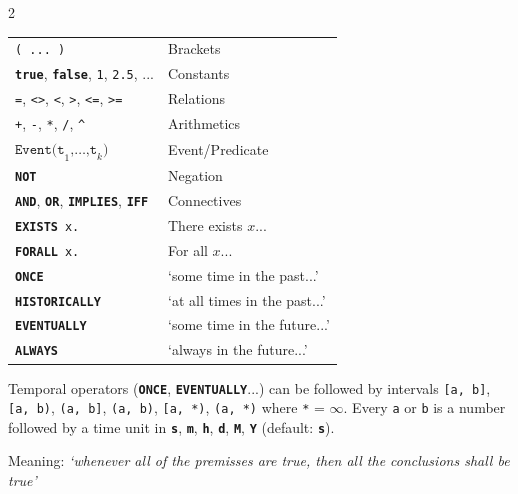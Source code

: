 \documentclass[a4paper,9pt]{extarticle}
\newcommand{\kw}[1]{{\color{magenta}\texttt{\bfseries\upshape #1}}}
\newcommand{\bluekw}[1]{{\color{blue}\texttt{\bfseries\upshape #1}}}
\begin{document}
\begin{multicols}{2}
    \begin{tcolorbox}[title={\bfseries 4 \quad Expressions}, colframe=blue!75!black, left=1pt, right=1pt]    
      \begin{tabular}{ll}
        \texttt{( ... )} & Brackets \\
        \kw{true}, \kw{false}, \texttt{1}, \texttt{2.5}, ... & Constants \\
        \texttt{=}, \texttt{<>}, \texttt{<}, \texttt{>}, \texttt{<=}, \texttt{>=} & Relations\\
        \texttt{+}, \texttt{-}, \texttt{*}, \texttt{/}, \texttt{\^} & Arithmetics\\
        $\texttt{Event}\texttt{(t}_1\texttt{,}\dots\texttt{,t}_k\texttt{)}$ & Event/Predicate \\
        \kw{NOT} & Negation \\
        \kw{AND}, \kw{OR}, \kw{IMPLIES}, \kw{IFF} & Connectives \\
        \kw{EXISTS}~\texttt{x.} & There exists $x$...\\
        \kw{FORALL}~\texttt{x.} & For all $x$... \\
        \kw{ONCE} & `some time in the past...' \\
        \kw{HISTORICALLY} & `at all times in the past...'  \\
        \kw{EVENTUALLY} & `some time in the future...'\\
        \kw{ALWAYS} & `always in the future...'
      \end{tabular}
    \end{tcolorbox}

    \begin{tcolorbox}[title={\bfseries 5 \quad Intervals}, colframe=blue!75!black, left=1pt, right=1pt, top=0pt, bottom=0pt]
      Temporal operators (\kw{ONCE}, \kw{EVENTUALLY}...) can be followed by intervals \texttt{[a, b]}, \texttt{[a, b)},
      \texttt{(a, b]}, \texttt{(a, b)}, \texttt{[a, *)}, \texttt{(a, *)} where \texttt{*} = $\infty$.
     Every \texttt{a} or \texttt{b} is a number followed by a time unit in \bluekw{s}, \bluekw{m},
      \bluekw{h}, \bluekw{d}, \bluekw{M}, \bluekw{Y} (default: \bluekw{s}).
    \end{tcolorbox}

    \begin{tcolorbox}[title={\bfseries 6 \quad Rules}, colframe=blue!75!black, left=1pt, right=1pt, top=0pt, bottom=0pt]
      \begin{tcolorbox}[title=6.1 Obligation rules, left=1pt, right=1pt]
        Meaning: \emph{`whenever all of the premisses are true, then all the conclusions shall be true'}


\end{tcolorbox}
\end{tcolorbox}
\end{multicols}
\end{document}
